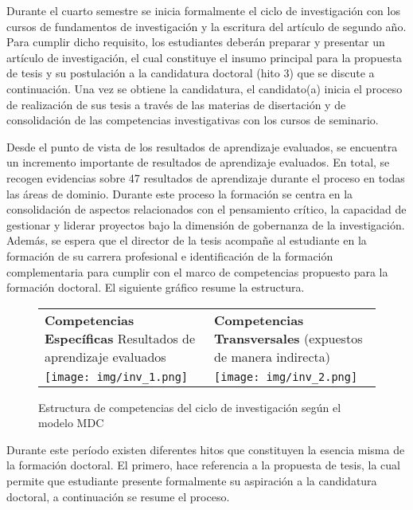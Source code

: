 Durante el cuarto semestre se inicia formalmente el ciclo de investigación con los cursos de fundamentos de investigación y la escritura del artículo de segundo año. Para cumplir dicho requisito, los estudiantes deberán preparar y presentar un artículo de investigación, el cual constituye el insumo principal para la propuesta de tesis y su postulación a la candidatura doctoral (hito 3) que se discute a continuación. Una vez se obtiene la candidatura, el candidato(a) inicia el proceso de realización de sus tesis a través de las materias de disertación y de consolidación de las competencias investigativas con los cursos de seminario.

Desde el punto de vista de los resultados de aprendizaje evaluados, se encuentra un incremento importante de resultados de aprendizaje evaluados. En total, se recogen evidencias sobre 47 resultados de aprendizaje durante el proceso en todas las áreas de dominio. Durante este proceso la formación se centra en la consolidación de aspectos relacionados con el pensamiento crítico, la capacidad de gestionar y liderar proyectos bajo la dimensión de gobernanza de la investigación. Además, se espera que el director de la tesis acompañe al estudiante en la formación de su carrera profesional e identificación de la formación complementaria para cumplir con el marco de competencias propuesto para la formación doctoral. El siguiente gráfico resume la estructura.

\begin{figure}[H]
\caption{Estructura de competencias del ciclo de investigación según el modelo MDC \label{Estructura} }
\begin{center}
\begin{tabular}{p{}|p{}}
   \textbf{Competencias Específicas}
Resultados de aprendizaje evaluados
  & \textbf{Competencias Transversales} (expuestos de manera indirecta)  \\
  \texttt{[image: img/inv\_1.png]}   &  \texttt{[image: img/inv\_2.png]}
\end{tabular}

\end{center}
\end{figure}

Durante este período existen diferentes hitos que constituyen la esencia misma de la formación doctoral. El primero, hace referencia a la propuesta de tesis, la cual permite que estudiante presente formalmente su aspiración a la candidatura doctoral, a continuación se resume el proceso.

